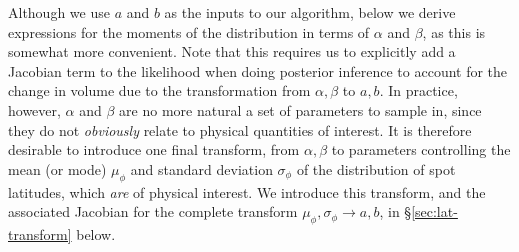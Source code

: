 \documentclass[modern]{aastex62}
\begin{document}
Although we use $a$ and $b$ as the inputs to our algorithm, below
we derive expressions for the moments of the distribution in terms
of $\alpha$ and $\beta$, as this is somewhat more convenient. Note that
this requires us to explicitly add a Jacobian term to the likelihood
when doing posterior inference to account for the change in volume due
to the transformation from $\alpha, \beta$ to $a, b$. In practice, however,
$\alpha$ and $\beta$ are no more natural a set of parameters to sample in,
since they do not \emph{obviously} relate to physical quantities of interest.
It is therefore desirable to introduce one final transform, from $\alpha, \beta$
to parameters controlling the mean (or mode) $\mu_\phi$ and
standard deviation  $\sigma_\phi$ of the
distribution of spot latitudes, which \emph{are} of physical interest.
We introduce this transform, and the associated Jacobian for the complete
transform $\mu_\phi, \sigma_\phi \rightarrow a, b$,
in \S\ref{sec:lat-transform} below.
\end{document}
